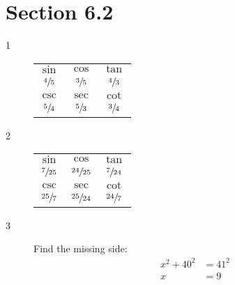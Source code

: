 \documentclass{exam}
\begin{document}
  \ifprintanswers

    \section{Section 6.2}
    \begin{description}

      \item[1] 
        \begin{tabular}[H]{ccc}
          \toprule

          $\sin$         & $\cos$         & $\tan$         \\
          $\sfrac{4}{5}$ & $\sfrac{3}{5}$ & $\sfrac{4}{3}$ \\

          \midrule
          $\csc$         & $\sec$         & $\cot$ \\
          $\sfrac{5}{4}$ & $\sfrac{5}{3}$ & $\sfrac{3}{4}$ \\

          \bottomrule
        \end{tabular}

      \item[2] 
        \begin{tabular}[H]{ccc}
          \toprule

          $\sin$          & $\cos$           & $\tan$          \\
          $\sfrac{7}{25}$ & $\sfrac{24}{25}$ & $\sfrac{7}{24}$ \\

          \midrule

          $\csc$          & $\sec$           & $\cot$ \\
          $\sfrac{25}{7}$ & $\sfrac{25}{24}$ & $\sfrac{24}{7}$ \\

          \bottomrule
        \end{tabular}

      \pagebreak

      \item[3] 
        Find the missing side:
        \begin{align*}
          x^2 + 40^2 & = 41^2 \\
          x          & = 9 \\
        \end{align*}

        \begin{tabular}[H]{ccc}
          \toprule


\end{tabular}
\end{description}
\end{document}
